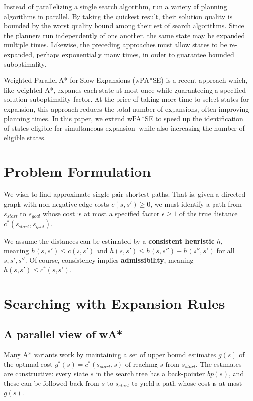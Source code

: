 \documentclass[letterpaper]{article}
\begin{document}
Instead of parallelizing a single search algorithm, \cite{valenzano10} run a variety of planning algorithms in parallel.
By taking the quickest result, their solution quality is bounded by the worst quality bound among their set of search algorithms. Since the planners run independently of one another, the same state may be expanded multiple times.
Likewise, the preceding approaches must allow states to be re-expanded, perhaps exponentially many times, in order to guarantee bounded suboptimality.

Weighted Parallel A* for Slow Expansions (wPA*SE) \cite{phillips2014pa}
is a recent approach which, like weighted A*, expands each state at most once
while guaranteeing a specified solution suboptimality factor. At the price of taking more time to select states for expansion, this approach reduces the total number of expansions, often improving planning times.
In this paper, we extend wPA*SE to speed up the identification of states eligible for simultaneous expansion, while also increasing the number of eligible states.

\section{Problem Formulation}

We wish to find approximate single-pair shortest-paths. That is, given a directed graph with non-negative edge costs $c(s,s') \ge 0$, we must identify a path from $s_{start}$ to $s_{goal}$ whose cost is at most a specified factor $\epsilon\ge 1$ of the true distance $c^*(s_{start},s_{goal})$.

We assume the distances can be estimated by a \textbf{consistent heuristic} $h$, meaning $h(s,s')\le c(s,s')$ and $h(s,s')\le h(s,s'') + h(s'',s')$ for all $s,s',s''$. Of course, consistency implies \textbf{admissibility}, meaning $h(s,s')\le c^*(s,s')$.

\section{Searching with Expansion Rules}

\subsection{A parallel view of wA*}

Many A* variants work by maintaining a set of upper bound estimates $g(s)$ of the optimal cost $g^*(s) = c^*(s_{start},s)$ of reaching $s$ from $s_{start}$. The estimates are constructive: every state $s$ in the search tree has a back-pointer $bp(s)$, and these can be followed back from $s$ to $s_{start}$ to yield a path whose cost is at most $g(s)$.
\end{document}
